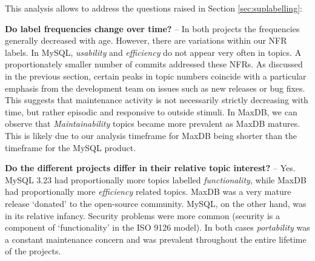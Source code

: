 \documentclass[]{sig-alternate}
\newcommand{\XXX}[1]{\textcolor{red}{{\it \textbf{[XXX: #1]}}}}
\begin{document}


This analysis allows to address the questions raised in Section \ref{sec:suplabelling}:

\textbf{Do label frequencies change over time?} -- In both projects the frequencies generally decreased with age. 
However, there are variations within our NFR labels. In MySQL, \emph{usability} and \emph{efficiency} do not appear very often in topics. 
A proportionately smaller number of commits addressed these NFRs.
As discussed in the previous section, certain peaks in topic numbers coincide with a particular emphasis from the development team on issues such as new releases or bug fixes.
This suggests that maintenance activity is not necessarily strictly decreasing with time, but rather episodic and responsive to outside stimuli. 
In MaxDB, we can observe that \emph{Maintainability} topics became more prevalent as MaxDB matures. 
This is likely due to our analysis timeframe for MaxDB being shorter than the timeframe for the MySQL product. 



\textbf{Do the different projects differ in their relative topic interest?} -- 
Yes. MySQL 3.23 had proportionally more
topics labelled \emph{functionality}, while MaxDB had proportionally more
\emph{efficiency} related topics. MaxDB was a very mature release `donated' to the open-source community. 
MySQL, on the other hand, was in its relative infancy. 
Security problems were more common (security is a component of `functionality' in the ISO 9126 model). 
In both cases \emph{portability} was a constant maintenance concern and was prevalent throughout the entire lifetime of the projects. 
\end{document}
